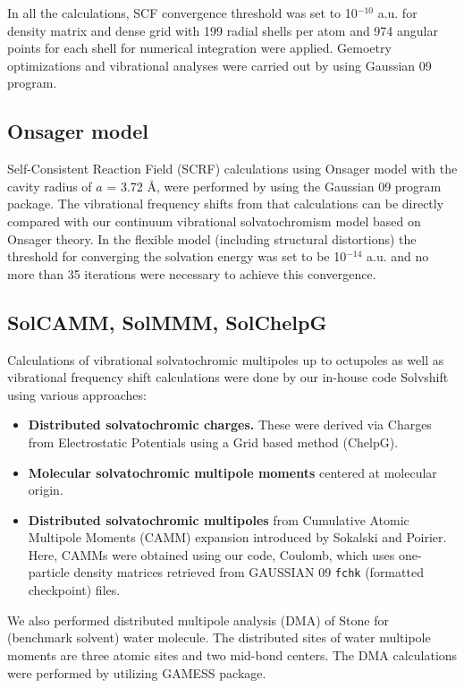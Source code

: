 \documentclass[a4paper,titlepage,twoside,fleqn,12pt]{book}
\begin{document}
\begin{appendices}
\begin{refsection}
In all the calculations, SCF convergence threshold
was set to 10$^{-10}$ a.u. for density matrix and dense grid with
199 radial shells per atom and 974 angular points for each
shell for numerical integration were applied.%
Gemoetry optimizations and vibrational analyses were carried out
by using {\sc Gaussian 09} program.%

\subsection{Onsager model}

Self\hyp{}Consistent Reaction Field (SCRF) calculations
using Onsager model%
with the cavity radius of
$a$ = 3.72 \AA, were performed by using the {\sc Gaussian 09} program package.
The vibrational frequency shifts from that calculations can be directly
compared with our continuum vibrational solvatochromism model
based on Onsager theory. In the flexible model (including structural
distortions) the threshold for converging the solvation energy
was set to be 10$^{-14}$ a.u. and no more than 35 iterations were necessary
to achieve this convergence.


\subsection{SolCAMM, SolMMM, SolChelpG}

Calculations
of vibrational solvatochromic multipoles up to octupoles as
well as vibrational frequency shift calculations were done by
our in\hyp{}house code {\sc Solvshift} using various approaches:
%
\begin{itemize}
\item {\bf Distributed solvatochromic charges.} These were derived
via Charges from Electrostatic Potentials using a Grid
based method (ChelpG).%
\item {\bf Molecular solvatochromic multipole moments}
centered at molecular origin.%
\item {\bf Distributed solvatochromic multipoles} from Cumulative
Atomic Multipole Moments (CAMM) expansion introduced
by Sokalski and Poirier.%
Here, CAMMs were obtained using our code,
{\sc Coulomb}, which uses one\hyp{}particle density matrices retrieved
from GAUSSIAN 09 \verb+fchk+ (formatted checkpoint)
files. 
\end{itemize}
%
We also performed
distributed multipole analysis (DMA) of Stone%
for (benchmark
solvent) water molecule. The distributed sites of water
multipole moments are three atomic sites and two mid\hyp{}bond
centers. The DMA calculations were performed by utilizing
GAMESS package.%


\end{refsection}
\end{appendices}
\end{document}
